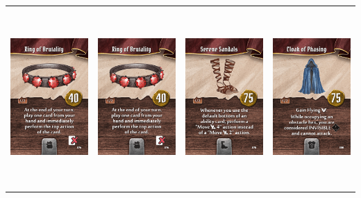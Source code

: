 \documentclass{minimal}
\begin{document}
{\begin{longtable}{llll}
\includegraphics[width=44mm,height=68mm]{./50-56/gh-056-ring-of-brutality.png} &
\includegraphics[width=44mm,height=68mm]{./50-56/gh-056-ring-of-brutality.png} &
\includegraphics[width=44mm,height=68mm]{./57-63/gh-057-serene-sandals.png} &
\includegraphics[width=44mm,height=68mm]{./57-63/gh-058-cloak-of-phasing.png}\\ 

\end{longtable}}
\end{document}
